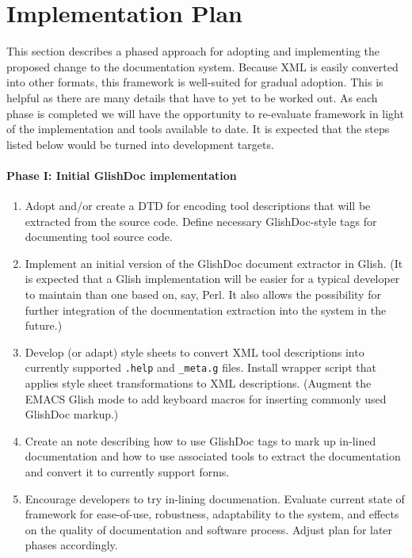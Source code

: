 \section{Implementation Plan}

This section describes a phased approach for adopting and implementing
the proposed change to the documentation system.  Because XML is
easily converted into other formats, this framework is well-suited for
gradual adoption.  This is helpful as there are many details that have
to yet to be worked out.  As each phase is completed we will have the
opportunity to re-evaluate framework in light of the implementation
and tools available to date.  It is expected that the steps listed
below would be turned into development targets.

\paragraph{Phase I: Initial GlishDoc implementation}

\begin{enumerate}

\item Adopt and/or create a DTD for encoding tool descriptions that will 
be extracted from the source code.  Define necessary GlishDoc-style
tags for documenting tool source code.  

\item Implement an initial version of the GlishDoc document extractor
in Glish.  (It is expected that a Glish implementation will be easier
for a typical \aipspp developer to maintain than one based on, say,
Perl.  It also allows the possibility for further integration of the
documentation extraction into the \aipspp system in the future.)  

\item Develop (or adapt) style sheets to convert XML tool
descriptions into currently supported {\tt .help} and {\tt \_meta.g}
files.  Install wrapper script that applies style sheet
transformations to XML descriptions.  (Augment the EMACS Glish mode to
add keyboard macros for inserting commonly used GlishDoc markup.)

\item Create an \aipspp note describing how to use GlishDoc tags to
mark up in-lined documentation and how to use associated tools to
extract the documentation and convert it to currently support forms. 

\item Encourage developers to try in-lining documenation.  Evaluate
current state of framework for ease-of-use, robustness, adaptability
to the \aipspp system, and effects on the quality of documentation and
software process.  Adjust plan for later phases accordingly.

\end{enumerate}

